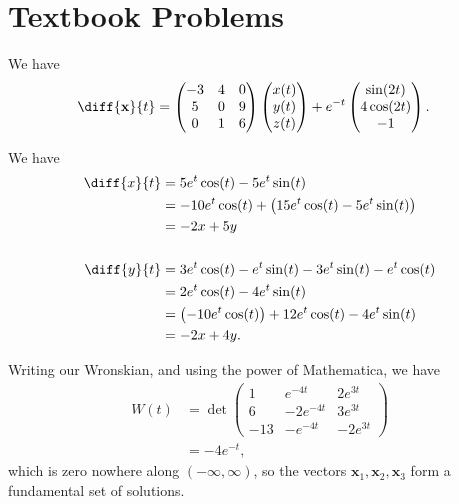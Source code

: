 \documentclass[10pt]{mypackage}
\begin{document}
\RaggedRight
\section{Textbook Problems}%
\begin{solution}[8.1, Problem 6]
  We have
  \begin{align*}
    \diff{\mathbf{x}}{t} &= \begin{pmatrix}-3 & 4 & 0\\5 & 0 & 9 \\ 0 & 1 & 6\end{pmatrix} \begin{pmatrix}x(t)\\y(t)\\z(t)\end{pmatrix} + e^{-t}\begin{pmatrix}\sin(2t) \\ 4\cos(2t) \\-1 \end{pmatrix}.
  \end{align*}
\end{solution}
\begin{solution}[8.1, Problem 12]
  We have
  \begin{align*}
    \diff{x}{t} &= 5e^{t}\cos(t) - 5e^{t}\sin(t)\\
                &= -10e^{t}\cos(t) + \left( 15e^{t}\cos(t) - 5e^{t}\sin(t) \right)\\
                &= -2x + 5y\\
                \\
    \diff{y}{t} &= 3e^{t}\cos(t) - e^{t}\sin(t) - 3e^{t}\sin(t) - e^{t}\cos(t)\\
                &= 2e^{t}\cos(t) - 4e^{t}\sin(t)\\
                &= \left( -10e^{t}\cos(t) \right) + 12e^{t}\cos(t) - 4e^{t}\sin(t)\\
                &= -2x + 4y.
  \end{align*}
\end{solution}
\begin{solution}[8.1, Problem 20]
  Writing our Wronskian, and using the power of Mathematica, we have
  \begin{align*}
    W(t) &= \det \begin{pmatrix}1 & e^{-4t} & 2e^{3t} \\ 6 & -2e^{-4t} & 3e^{3t} \\ -13 & -e^{-4t} & -2e^{3t}\end{pmatrix}\\
         &= -4e^{-t},
  \end{align*}
  which is zero nowhere along $(-\infty,\infty)$, so the vectors $\mathbf{x}_1,\mathbf{x}_2,\mathbf{x}_3$ form a fundamental set of solutions.
\end{solution}
\end{document}
